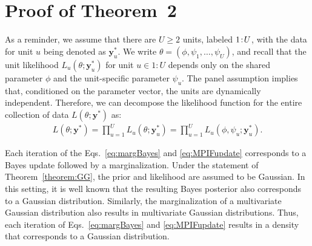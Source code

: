 \section{Proof of Theorem~2}\label{appendix:Gaus}

As a reminder, we assume that there are $U\geq 2$ units, labeled ${1}\!:\!{U}$, with the data for unit $u$ being denoted as $\bm{y}^*_u$. 
We write $\theta = (\phi, \psi_1, \ldots, \psi_U)$, and recall that the unit likelihood $L_{u}(\theta;\bm{y}^*_u)$ for unit $u \in 1:U$ depends only on the shared parameter $\phi$ and the unit-specific parameter $\psi_u$.
The panel assumption implies that, conditioned on the parameter vector, the units are dynamically independent.
Therefore, we can decompose the likelihood function for the entire collection of data $L(\theta; \bm{y}^*)$ as:
\begin{align*}
    L(\theta; \bm{y}^*) = \prod_{u = 1}^U L_u(\theta;\bm{y}_u^*) = \prod_{u = 1}^U L_u(\phi, \psi_u;\bm{y}_u^*).
\end{align*}

Each iteration of the Eqs.~\ref{eq:margBayes} and \ref{eq:MPIFupdate} corresponds to a Bayes update followed by a marginalization. 
Under the statement of Theorem~\ref{theorem:GG}, the prior and likelihood are assumed to be Gaussian.
In this setting, it is well known that the resulting Bayes posterior also corresponds to a Gaussian distribution. 
Similarly, the marginalization of a multivariate Gaussian distribution also results in multivariate Gaussian distributions. 
Thus, each iteration of Eqs.~\ref{eq:margBayes} and \ref{eq:MPIFupdate} results in a density that corresponds to a Gaussian distribution. 

